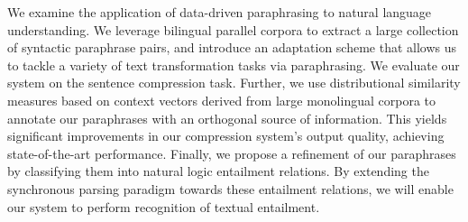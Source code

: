 We examine the application of data-driven paraphrasing to natural language understanding. We leverage bilingual parallel corpora to extract a large
 collection of syntactic paraphrase pairs, and introduce an adaptation scheme
 that allows us to tackle a variety of text transformation tasks via
 paraphrasing. We evaluate our system on the sentence compression task. Further,
 we use distributional similarity measures based on context vectors derived from
 large monolingual corpora to annotate our paraphrases with an orthogonal source
 of information. This yields significant improvements in our compression
 system's output quality, achieving state-of-the-art performance. Finally, we
 propose a refinement of our paraphrases by classifying them into natural logic
 entailment relations. By extending the synchronous parsing paradigm towards
 these entailment relations, we will enable our system to perform recognition of
 textual entailment.

